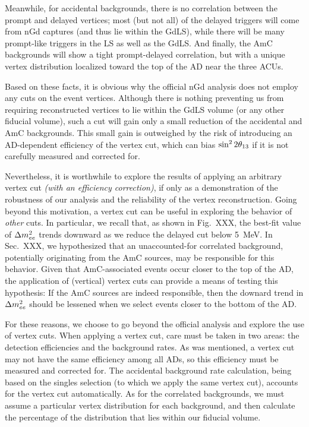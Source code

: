 \documentclass[../thesis.tex]{subfiles}
\begin{document}
Meanwhile, for accidental backgrounds, there is no correlation between the prompt and delayed vertices; most (but not all) of the delayed triggers will come from nGd captures (and thus lie within the GdLS), while there will be many prompt-like triggers in the LS as well as the GdLS. And finally, the AmC backgrounds will show a tight prompt-delayed correlation, but with a unique vertex distribution localized toward the top of the AD near the three ACUs.

Based on these facts, it is obvious why the official nGd analysis does not employ any cuts on the event vertices. Although there is nothing preventing us from requiring reconstructed vertices to lie within the GdLS volume (or any other fiducial volume), such a cut will gain only a small reduction of the accidental and AmC backgrounds. This small gain is outweighed by the risk of introducing an AD-dependent efficiency of the vertex cut, which can bias $\sin^2 2\theta_{13}$ if it is not carefully measured and corrected for.

Nevertheless, it is worthwhile to explore the results of applying an arbitrary vertex cut \emph{(with an efficiency correction)}, if only as a demonstration of the robustness of our analysis and the reliability of the vertex reconstruction. Going beyond this motivation, a vertex cut can be useful in exploring the behavior of \emph{other} cuts. In particular, we recall that, as shown in Fig.~XXX, the best-fit value of $\Delta m^2_{ee}$ trends downward as we reduce the delayed cut below 5~MeV. In Sec.~XXX, we hypothesized that an unaccounted-for correlated background, potentially originating from the AmC sources, may be responsible for this behavior. Given that AmC-associated events occur closer to the top of the AD, the application of (vertical) vertex cuts can provide a means of testing this hypothesis: If the AmC sources are indeed responsible, then the downard trend in $\Delta m^2_{ee}$ should be lessened when we select events closer to the bottom of the AD\@.

For these reasons, we choose to go beyond the official analysis and explore the use of vertex cuts. When applying a vertex cut, care must be taken in two areas: the detection efficiencies and the background rates. As was mentioned, a vertex cut may not have the same efficiency among all ADs, so this efficiency must be measured and corrected for. The accidental background rate calculation, being based on the singles selection (to which we apply the same vertex cut), accounts for the vertex cut automatically. As for the correlated backgrounds, we must assume a particular vertex distribution for each background, and then calculate the percentage of the distribution that lies within our fiducial volume.
\end{document}

